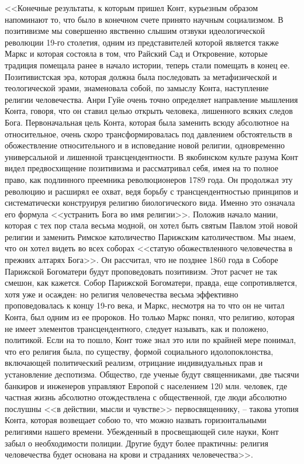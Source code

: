 \documentclass{book}
\begin{document}
<<Конечные результаты, к которым пришел Конт, курьезным образом напоминают то, что было в конечном счете принято научным социализмом. В позитивизме мы совершенно явственно слышим отзвуки идеологической революции 19-го столетия, одним из представителей которой является также Маркс и которая состояла в том, что Райский Сад и Откровение, которые традиция помещала ранее в начало истории, теперь стали помещать в конец ее. Позитивистская эра, которая должна была последовать за метафизической и теологической эрами, знаменовала собой, по замыслу Конта, наступление религии человечества. Анри Гуйе очень точно определяет направление мышления Конта, говоря, что он ставил целью открыть человека, лишенного всяких следов Бога. Первоначальная цель Конта, которая была заменить всюду абсолютное на относительное, очень скоро трансформировалась под давлением обстоятельств в обожествление относительного и в исповедание новой религии, одновременно универсальной и лишенной трансцендентности. В якобинском культе разума Конт видел 
предвосхищение позитивизма и рассматривал себя, имея на то полное право, как подлинного преемника революционеров 1789 года. Он продолжал эту революцию и расширял ее охват, ведя борьбу с трансцендентностью принципов и систематически конструируя религию биологического вида. Именно это означала его формула <<устранить Бога во имя религии>>. Положив начало мании, которая с тех пор стала весьма модной, он хотел быть святым Павлом этой новой религии и заменить Римское католичество Парижским католичеством. Мы знаем, что он хотел видеть во всех соборах <<статую обожествленного человечества в прежних алтарях Бога>>. Он рассчитал, что не позднее 1860 года в Соборе Парижской Богоматери будут проповедовать позитивизм. Этот расчет не так смешон, как кажется. Собор Парижской Богоматери, правда, еще сопротивляется, хотя уже и осажден: но рели­гия человечества весьма эффективно проповедовалась к концу 19-го века, и Маркс, несмотря на то что он не читал Конта, был одним из ее пророков. Но только Маркс понял, что рели­гию, 
которая не имеет элементов трансцендентного, следует называть, как и положено, политикой. Если на то пошло, Конт тоже знал это или по крайней мере понимал, что его религия была, по существу, формой социального идолопоклонства, включающей политический реализм, отрицание индивидуальных прав и установление деспотизма. Общество, где ученые будут священниками, две тысячи банкиров и инженеров управ­ляют Европой с населением 120 млн. человек, где частная жизнь абсолютно отождествлена с общественной, где люди абсолютно послушны <<в действии, мысли и чувстве>> первосвященнику, -- такова утопия Конта, которая возвещает собою то, что можно назвать горизонтальными религиями нашего времени. Убежденный в просвещающей силе науки, Конт забыл о необходи­мости полиции. Другие будут более практичны: религия человечества будет основана на крови и страданиях человечества>>.%
\end{document}
